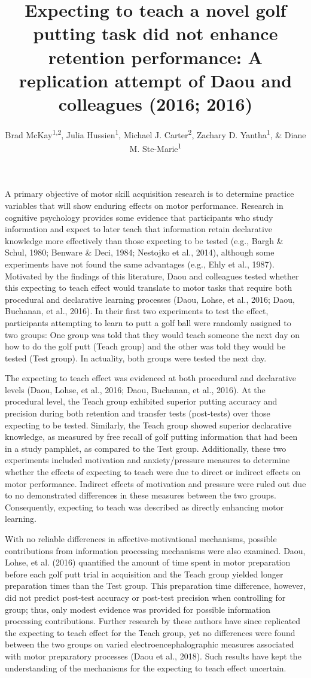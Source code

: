 \documentclass[
  english,
  man,floatsintext]{apa7}
\title{Expecting to teach a novel golf putting task did not enhance retention performance: A replication attempt of Daou and colleagues (2016; 2016)}
\author{Brad McKay\textsuperscript{1,2}, Julia Hussien\textsuperscript{1}, Michael J. Carter\textsuperscript{2}, Zachary D. Yantha\textsuperscript{1}, \& Diane M. Ste-Marie\textsuperscript{1}}
\date{}
\affiliation{\vspace{0.5cm}\textsuperscript{1} School of Human Kinetics, University of Ottawa\\\textsuperscript{2} Department of Kinesiology, McMaster University}
\begin{document}
\maketitle

A primary objective of motor skill acquisition research is to determine practice variables that will show enduring effects on motor performance. Research in cognitive psychology provides some evidence that participants who study information and expect to later teach that information retain declarative knowledge more effectively than those expecting to be tested (e.g., Bargh \& Schul, 1980; Benware \& Deci, 1984; Nestojko et al., 2014), although some experiments have not found the same advantages (e.g., Ehly et al., 1987). Motivated by the findings of this literature, Daou and colleagues tested whether this expecting to teach effect would translate to motor tasks that require both procedural and declarative learning processes (Daou, Lohse, et al., 2016; Daou, Buchanan, et al., 2016). In their first two experiments to test the effect, participants attempting to learn to putt a golf ball were randomly assigned to two groups: One group was told that they would teach someone the next day on how to do the golf putt (Teach group) and the other was told they would be tested (Test group). In actuality, both groups were tested the next day.

The expecting to teach effect was evidenced at both procedural and declarative levels (Daou, Lohse, et al., 2016; Daou, Buchanan, et al., 2016). At the procedural level, the Teach group exhibited superior putting accuracy and precision during both retention and transfer tests (post-tests) over those expecting to be tested. Similarly, the Teach group showed superior declarative knowledge, as measured by free recall of golf putting information that had been in a study pamphlet, as compared to the Test group. Additionally, these two experiments included motivation and anxiety/pressure measures to determine whether the effects of expecting to teach were due to direct or indirect effects on motor performance. Indirect effects of motivation and pressure were ruled out due to no demonstrated differences in these measures between the two groups. Consequently, expecting to teach was described as directly enhancing motor learning.

With no reliable differences in affective-motivational mechanisms, possible contributions from information processing mechanisms were also examined. Daou, Lohse, et al. (2016) quantified the amount of time spent in motor preparation before each golf putt trial in acquisition and the Teach group yielded longer preparation times than the Test group. This preparation time difference, however, did not predict post-test accuracy or post-test precision when controlling for group; thus, only modest evidence was provided for possible information processing contributions. Further research by these authors have since replicated the expecting to teach effect for the Teach group, yet no differences were found between the two groups on varied electroencephalographic measures associated with motor preparatory processes (Daou et al., 2018). Such results have kept the understanding of the mechanisms for the expecting to teach effect uncertain.
\end{document}
